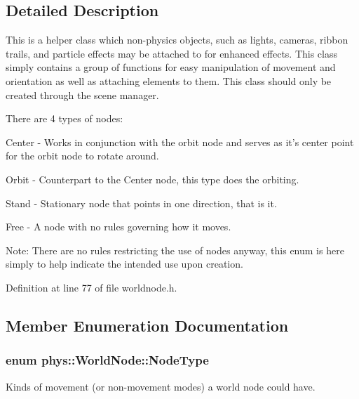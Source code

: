 \subsection{Detailed Description}
This is a helper class which non-\/physics objects, such as lights, cameras, ribbon trails, and particle effects may be attached to for enhanced effects. This class simply contains a group of functions for easy manipulation of movement and orientation as well as attaching elements to them. This class should only be created through the scene manager. \par
 There are 4 types of nodes: \par
 Center -\/ Works in conjunction with the orbit node and serves as it's center point for the orbit node to rotate around. \par
 Orbit -\/ Counterpart to the Center node, this type does the orbiting. \par
 Stand -\/ Stationary node that points in one direction, that is it. \par
 Free -\/ A node with no rules governing how it moves. \par
 Note: There are no rules restricting the use of nodes anyway, this enum is here simply to help indicate the intended use upon creation. 

Definition at line 77 of file worldnode.h.



\subsection{Member Enumeration Documentation}
\hypertarget{classphys_1_1WorldNode_a0b178b06aa411b00c4c2ccd926d9bf5a}{
\subsubsection[{NodeType}]{\setlength{\rightskip}{0pt plus 5cm}enum {\bf phys::WorldNode::NodeType}}}
\label{d2/d3e/classphys_1_1WorldNode_a0b178b06aa411b00c4c2ccd926d9bf5a}


Kinds of movement (or non-\/movement modes) a world node could have. 

